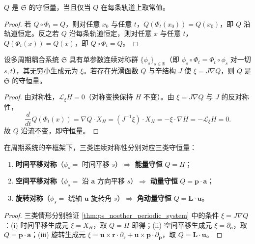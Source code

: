 \begin{lemma}[守恒量刻画轨道]\label{lem:ps_conserved_quantity_characterisation}
$Q$ 是 $\mathfrak{S}$ 的守恒量，当且仅当 $Q$ 在每条轨道上取常值。
\end{lemma}

\begin{proof}
若 $Q\circ\Phi_t=Q$，则对任意 $x_0$ 与任意 $t$，$Q(\Phi_t(x_0))=Q(x_0)$，即 $Q$ 沿轨道恒定。反之若 $Q$ 沿每条轨道恒定，则对任意 $x$ 与任意 $t$，$Q(\Phi_t(x))=Q(x)$，即 $Q\circ\Phi_t=Q$。
\end{proof}

\begin{theorem}[周期系统的诺特对应]\label{thm:ps_noether_periodic_system}
设多周期耦合系统 $\mathfrak{S}$ 具有单参数连续对称群 $\{\phi_s\}_{s\in\mathbb{R}}$（即 $\phi_s\circ\Phi_t=\Phi_t\circ\phi_s$ 对一切 $s,t$），其无穷小生成元为 $\xi$。若存在光滑函数 $Q$ 与辛结构 $J$ 使 $\xi = J\nabla Q$，则 $Q$ 是 $\mathfrak{S}$ 的守恒量。
\end{theorem}

\begin{proof}
由对称性，$\mathcal{L}_\xi H = 0$（对称变换保持 $H$ 不变）。由 $\xi = J\nabla Q$ 与 $J$ 的反对称性，
\[
\frac{d}{dt}Q(\Phi_t(x)) = \nabla Q\cdot X_H = (J^{-1}\xi)\cdot X_H = -\xi\cdot\nabla H = -\mathcal{L}_\xi H = 0.
\]
故 $Q$ 沿流不变，即守恒量。
\end{proof}

\begin{corollary}[三类对称与三类守恒量]\label{cor:ps_three_symmetries_conservation}
在周期系统的辛框架下，三类连续对称性分别对应三类守恒量：
\begin{enumerate}[label=(\roman*)]
    \item \textbf{时间平移对称}（$\phi_s = $ 时间平移 $s$）$\Rightarrow$ \textbf{能量守恒} $Q = H$；
    \item \textbf{空间平移对称}（$\phi_s = $ 沿 $\mathbf{a}$ 方向平移 $s$）$\Rightarrow$ \textbf{动量守恒} $Q = \mathbf{p}\cdot\mathbf{a}$；
    \item \textbf{旋转对称}（$\phi_s = $ 绕轴 $\mathbf{u}$ 旋转角 $s$）$\Rightarrow$ \textbf{角动量守恒} $Q = \mathbf{L}\cdot\mathbf{u}$。
\end{enumerate}
\end{corollary}

\begin{proof}
三类情形分别验证 \cref{thm:ps_noether_periodic_system} 中的条件 $\xi = J\nabla Q$：(i) 时间平移生成元 $\xi = X_H$，取 $Q = H$ 即得；(ii) 空间平移生成元 $\xi = \partial_{\mathbf{a}}$，取 $Q = \mathbf{p}\cdot\mathbf{a}$；(iii) 旋转生成元 $\xi = \mathbf{u}\times\mathbf{r}\cdot\partial_{\mathbf{r}} + \mathbf{u}\times\mathbf{p}\cdot\partial_{\mathbf{p}}$，取 $Q = \mathbf{L}\cdot\mathbf{u}$。
\end{proof}

